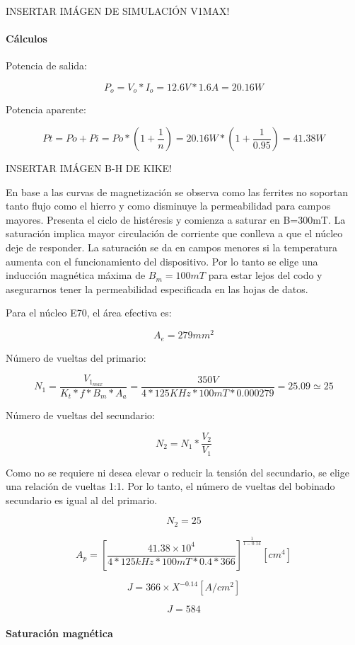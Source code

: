 INSERTAR IMÁGEN DE SIMULACIÓN V1MAX!

\paragraph{Cálculos}

Potencia de salida:

$$ P_{o}=V_{o}*I_{o}=12.6V*1.6A=20.16W $$

Potencia aparente: 

$$Pt=Po+Pi=Po*\left(1+\frac{1}{n}\right)=20.16W*\left(1+\frac{1}{0.95}\right)=41.38W  $$

INSERTAR IMÁGEN B-H DE KIKE!

En base a las curvas de magnetización se observa como las ferrites no soportan tanto flujo como el hierro y como disminuye la permeabilidad para campos mayores.  
Presenta el ciclo de histéresis y comienza a saturar en B=300mT. 
La saturación implica mayor circulación de corriente que conlleva a que el núcleo deje de responder. 
La saturación se da en campos menores si la temperatura aumenta con el funcionamiento del dispositivo. 
Por lo tanto se elige una inducción magnética máxima de $B_{m}=100mT$ para estar lejos del codo y asegurarnos tener la permeabilidad especificada en las hojas de datos. 

Para el núcleo E70, el área efectiva es: 

$$ A_{e}=279{mm}^{2} $$

Número de vueltas del primario:

$$ N_{1}=\frac{V_{1_{max}}}{K_{t}*f*B_{m}*A_{a}}=\frac{350V}{4*125KHz*100mT*0.000279}=25.09\simeq 25 $$

Número de vueltas del secundario: 

$$ N_{2}=N_{1}*\frac{V_{2}}{V_{1}} $$

Como no se requiere ni desea elevar o reducir la tensión del secundario, se elige una relación de vueltas 1:1. 
Por lo tanto, el número de vueltas del bobinado secundario es igual al del primario. 

$$ N_{2}=25 $$

$$ A_{p}=\left[\frac{41.38\times 10^{4}}{4*125kHz*100mT*0.4*366}\right]^{\frac{1}{1-0.14}} [cm^4] $$

$$ J=366\times X^{-0.14} [A/cm^2] $$

$$ J=584 $$

\paragraph{Saturación magnética}

